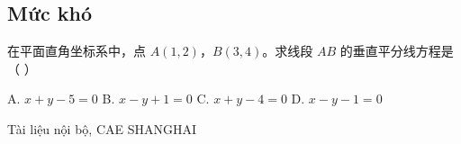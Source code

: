 \documentclass[11pt, a4paper]{article}
\begin{document}
\subsection{Mức khó}

\begin{baitap}[10]
在平面直角坐标系中，点 $A(1,2)$，$B(3,4)$。求线段 $AB$ 的垂直平分线方程是（ ）
\par\vspace{3pt}
\noindent A. $x + y - 5 = 0$ \quad B. $x - y + 1 = 0$ \quad C. $x + y - 4 = 0$ \quad D. $x - y - 1 = 0$
\end{baitap}
\vspace{0.8cm}
\begin{center}
{\footnotesize\color{cae_blue} Tài liệu nội bộ, CAE SHANGHAI}
\end{center}
\end{document}
